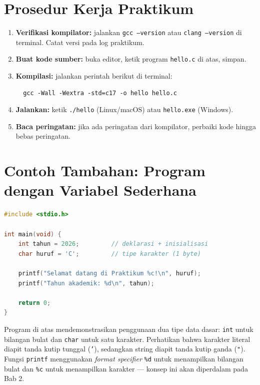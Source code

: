 \documentclass[../main.tex]{subfiles}
\begin{document}
\section{Prosedur Kerja Praktikum}

\begin{enumerate}[leftmargin=*]
  \item \textbf{Verifikasi kompilator:} jalankan \texttt{gcc --version} atau \texttt{clang --version} di terminal. Catat versi pada log praktikum.
  \item \textbf{Buat kode sumber:} buka editor, ketik program \texttt{hello.c} di atas, simpan.
  \item \textbf{Kompilasi:} jalankan perintah berikut di terminal:
  \begin{verbatim}
  gcc -Wall -Wextra -std=c17 -o hello hello.c
  \end{verbatim}
  \item \textbf{Jalankan:} ketik \texttt{./hello} (Linux/macOS) atau \texttt{hello.exe} (Windows).
  \item \textbf{Baca peringatan:} jika ada peringatan dari kompilator, perbaiki kode hingga bebas peringatan.
\end{enumerate}

\section{Contoh Tambahan: Program dengan Variabel Sederhana}

\begin{lstlisting}[language=C,caption={Program dengan variabel dan return value}]
#include <stdio.h>

int main(void) {
    int tahun = 2026;         // deklarasi + inisialisasi
    char huruf = 'C';         // tipe karakter (1 byte)

    printf("Selamat datang di Praktikum %c!\n", huruf);
    printf("Tahun akademik: %d\n", tahun);

    return 0;
}
\end{lstlisting}

Program di atas mendemonstrasikan penggunaan dua tipe data dasar: \texttt{int} untuk bilangan bulat dan \texttt{char} untuk satu karakter. Perhatikan bahwa karakter literal diapit tanda kutip tunggal (\texttt{'}), sedangkan string diapit tanda kutip ganda (\texttt{"}). Fungsi \texttt{printf} menggunakan \textit{format specifier} \texttt{\%d} untuk menampilkan bilangan bulat dan \texttt{\%c} untuk menampilkan karakter --- konsep ini akan diperdalam pada Bab 2.
\end{document}
